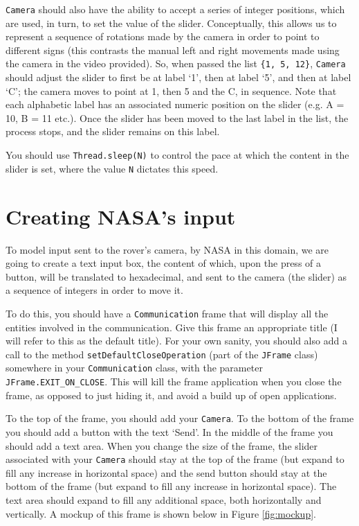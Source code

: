 \documentclass[11pt]{article}
\begin{document}
\texttt{Camera} should also have the ability to accept a series of integer positions, which are used, in turn, to set the value of the slider. Conceptually, this allows us to represent a sequence of rotations made by the camera in order to point to different signs (this contrasts the manual left and right movements made using the camera in the video provided). So, when passed the list \texttt{\{1, 5, 12\}}, \texttt{Camera} should adjust the slider to first be at label `1', then at label `5', and then at label `C'; the camera moves to point at 1, then 5 and the C, in sequence. Note that each alphabetic label has an associated numeric position on the slider (e.g. A = 10, B = 11 etc.). Once the slider has been moved to the last label in the list, the process stops, and the slider remains on this label.

You should use \texttt{Thread.sleep(N)} to control the pace at which the content in the slider is set, where the value \texttt{N} dictates this speed. 

\section{Creating NASA's input}

To model input sent to the rover's camera, by NASA in this domain, we are going to create a text input box, the content of which, upon the press of a button, will be translated to hexadecimal, and sent to the camera (the slider) as a sequence of integers in order to move it.

To do this, you should have a \texttt{Communication} frame that will display all the entities involved in the communication. Give this frame an appropriate title (I will refer to this as the default title). For your own sanity, you should also add a call to the method \texttt{setDefaultCloseOperation} (part of the \texttt{JFrame} class) somewhere in your \texttt{Communication} class, with the parameter \texttt{JFrame.EXIT\_ON\_CLOSE}. This will kill the frame application when you close the frame, as opposed to just hiding it, and avoid a build up of open applications. 

To the top of the frame, you should add your \texttt{Camera}. To the bottom of the frame you should add a button with the text `Send'. In the middle of the frame you should add a text area. When you change the size of the frame, the slider associated with your \texttt{Camera} should stay at the top of the frame (but expand to fill any increase in horizontal space) and the send button should stay at the bottom of the frame (but expand to fill any increase in horizontal space). The text area should expand to fill any additional space, both horizontally and vertically. A mockup of this frame is shown below in Figure \ref{fig:mockup}.
\end{document}
